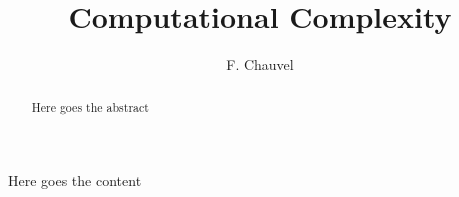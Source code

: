 \documentclass{aldast}
\title{Computational Complexity}
\author{F. Chauvel}
\begin{document}
\maketitle

\begin{abstract}
   Here goes the abstract
\end{abstract}

Here goes the content



\end{document}
